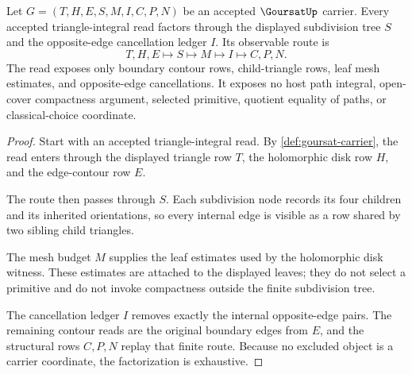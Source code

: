 \begin{theorem}
\label{thm:goursat-triangle-integral-boundary}
Let $G=(T,H,E,S,M,I,C,P,N)$ be an accepted $\GoursatUp$ carrier. Every accepted triangle-integral read factors through the displayed subdivision tree $S$ and the opposite-edge cancellation ledger $I$. Its observable route is
$$
T,H,E \longmapsto S \longmapsto M \longmapsto I \longmapsto C,P,N .
$$
The read exposes only boundary contour rows, child-triangle rows, leaf mesh estimates, and opposite-edge cancellations. It exposes no host path integral, open-cover compactness argument, selected primitive, quotient equality of paths, or classical-choice coordinate.
\end{theorem}
\begin{proof}
Start with an accepted triangle-integral read. By \autoref{def:goursat-carrier}, the read enters through the displayed triangle row $T$, the holomorphic disk row $H$, and the edge-contour row $E$.

The route then passes through $S$. Each subdivision node records its four children and its inherited orientations, so every internal edge is visible as a row shared by two sibling child triangles.

The mesh budget $M$ supplies the leaf estimates used by the holomorphic disk witness. These estimates are attached to the displayed leaves; they do not select a primitive and do not invoke compactness outside the finite subdivision tree.

The cancellation ledger $I$ removes exactly the internal opposite-edge pairs. The remaining contour reads are the original boundary edges from $E$, and the structural rows $C,P,N$ replay that finite route. Because no excluded object is a carrier coordinate, the factorization is exhaustive.
\end{proof}

